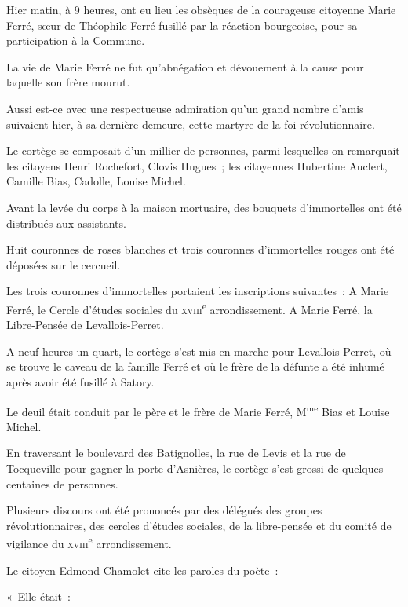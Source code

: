 \documentclass[french,twoside]{book} %
\newcommand{\astertri}{\medskip\par\centerline{\color{rubric}\large\selectfont{\syms ✻\,✻\,✻}}\medskip\par}%
\newenvironment{quoteblock}%
  {\begin{quoting}}
  {\end{quoting}}
\newenvironment{quotebar}{%
    \def\FrameCommand{{\color{rubric!10!}\vrule width 0.5em} \hspace{0.9em}}%
    \def\OuterFrameSep{\itemsep} %
    \MakeFramed {\advance\hsize-\width \FrameRestore}
  }%
  {%
    \endMakeFramed
  }
\renewenvironment{quoteblock}%
  {%
    \savenotes
    \setstretch{0.9}
    \normalfont
    \begin{quotebar}
  }
  {%
    \end{quotebar}
    \spewnotes
  }
\begin{document}
\begin{quoteblock}
 \noindent Hier matin, à 9 heures, ont eu lieu les obsèques de la courageuse citoyenne Marie Ferré, sœur de Théophile Ferré fusillé par la réaction bourgeoise, pour sa participation à la Commune.\par
 La vie de Marie Ferré ne fut qu’abnégation et dévouement à la cause pour laquelle son frère mourut.\par
 Aussi est-ce avec une respectueuse admiration qu’un grand nombre d’amis suivaient hier, à sa dernière demeure, cette martyre de la foi révolutionnaire.\par
 
\astertri

 \noindent Le cortège se composait d’un millier de personnes, parmi lesquelles on remarquait les citoyens Henri Rochefort, Clovis Hugues ; les citoyennes Hubertine Auclert, Camille Bias, Cadolle, Louise Michel.\par
 Avant la levée du corps à la maison mortuaire, des bouquets d’immortelles ont été distribués aux assistants.\par
 Huit couronnes de roses blanches et trois couronnes d’immortelles rouges ont été déposées sur le cercueil.\par
 Les trois couronnes d’immortelles portaient les inscriptions suivantes : A Marie Ferré, le Cercle d’études sociales du {\scshape xviii}\textsuperscript{e} arrondissement. A Marie Ferré, la Libre-Pensée de Levallois-Perret.\par
 A neuf heures un quart, le cortège s’est mis en marche pour Levallois-Perret, où se trouve le caveau de la famille Ferré et où le frère de la défunte a été inhumé après avoir été fusillé à Satory.\par
 Le deuil était conduit par le père et le frère de Marie Ferré, M\textsuperscript{me} Bias et Louise Michel.\par
 En traversant le boulevard des Batignolles, la rue de Levis et la rue de Tocqueville pour gagner la porte d’Asnières, le cortège s’est grossi de quelques centaines de personnes.\par
 Plusieurs discours ont été prononcés par des délégués des groupes révolutionnaires, des cercles d’études sociales, de la libre-pensée et du comité de vigilance du {\scshape xviii}\textsuperscript{e} arrondissement.\par
 Le citoyen Edmond Chamolet cite les paroles du poète :\par
 « Elle était :\par
 

\end{quoteblock}
\end{document}
